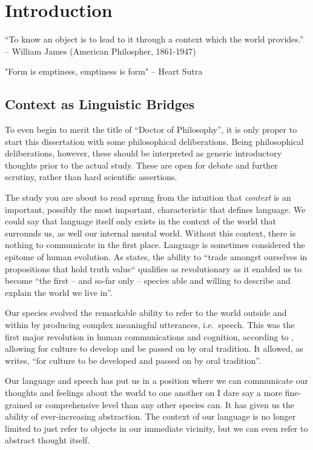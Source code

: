 \chapter{Introduction}
\label{chap:intro}

“To know an object is to lead to it through a context which the world provides.” -- William James (American Philospher, 1861-1947)

"Form is emptiness, emptiness is form" -- Heart Sutra

\section{Context as Linguistic Bridges}


To even begin to merit the title of ``Doctor of Philosophy'', it is only proper to start this dissertation with some
philosophical deliberations. Being philosophical deliberations, however, these should be interpreted as generic
introductory thoughts prior to the actual study. These are open for debate and further scrutiny, rather than hard
scientific assertions.

The study you are about to read sprung from the intuition that \emph{context}
is an important, possibly the most important, characteristic that defines
language. We could say that language itself only exists in the context of the world that
surrounds us, as well our internal mental world. Without this context, there is
nothing to communicate in the first place. Language is sometimes considered the
epitome of human evolution. As \cite{HARNAD91} states, the ability to ``trade amongst ourselves in propositions that hold truth value`` qualifies as revolutionary as it enabled us to become ``the first -- and so-far only -- species able and willing to describe and
explain the world we live in''.

Our species evolved the remarkable ability to refer to the world outside and within by producing complex meaningful
utterances, i.e.\ speech.  This was the first major revolution in human communications and cognition, according to
\cite{HARNAD91}, allowing for culture to develop and be passed on by oral tradition. It allowed, as \cite{HARNAD91}
writes, ``for culture to be developed and passed on by oral tradition''.

Our language and speech has put us in a position where we can communicate our thoughts and feelings about the world
to one another on I dare say a more fine-grained or comprehensive level than any other species can. It has given us the
ability of ever-increasing abstraction. The context of our language is no longer limited to just refer to objects in our
immediate vicinity, but we can even refer to abstract thought itself.

